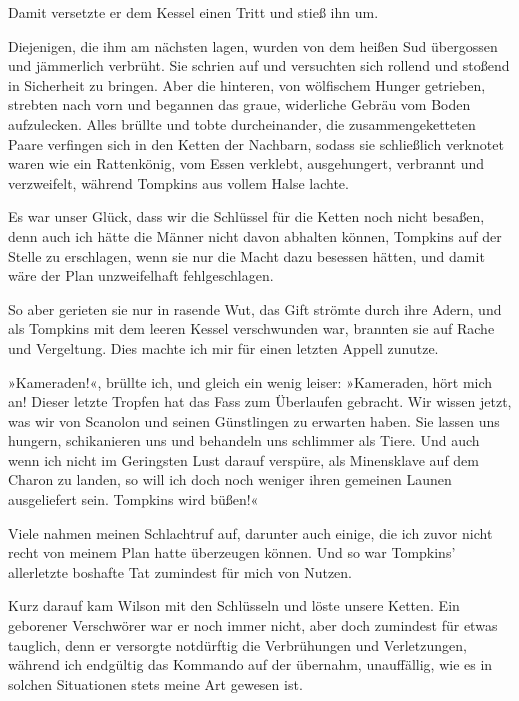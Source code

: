 Damit versetzte er dem Kessel einen Tritt und stieß ihn um.

Diejenigen, die ihm am nächsten lagen, wurden von dem heißen Sud
übergossen und jämmerlich verbrüht. Sie schrien auf und versuchten
sich rollend und stoßend in Sicherheit zu bringen. Aber die
hinteren, von wölfischem Hunger getrieben, strebten nach vorn und
begannen das graue, widerliche Gebräu vom Boden aufzulecken. Alles
brüllte und tobte durcheinander, die zusammengeketteten Paare
verfingen sich in den Ketten der Nachbarn, sodass sie schließlich
verknotet waren wie ein Rattenkönig, vom Essen verklebt,
ausgehungert, verbrannt und verzweifelt, während Tompkins aus
vollem Halse lachte.

Es war unser Glück, dass wir die Schlüssel für die Ketten noch
nicht besaßen, denn auch ich hätte die Männer nicht davon abhalten
können, Tompkins auf der Stelle zu erschlagen, wenn sie nur die
Macht dazu besessen hätten, und damit wäre der Plan unzweifelhaft
fehlgeschlagen.

\bigpar

So aber gerieten sie nur in rasende Wut, das Gift strömte durch
ihre Adern, und als Tompkins mit dem leeren Kessel verschwunden
war, brannten sie auf Rache und Vergeltung. Dies machte ich mir für
einen letzten Appell zunutze.

»Kameraden!«, brüllte ich, und gleich ein wenig leiser: »Kameraden,
hört mich an! Dieser letzte Tropfen hat das Fass zum Überlaufen
gebracht. Wir wissen jetzt, was wir von Scanolon und seinen
Günstlingen zu erwarten haben. Sie lassen uns hungern, schikanieren
uns und behandeln uns schlimmer als Tiere. Und auch wenn ich nicht
im Geringsten Lust darauf verspüre, als Minensklave auf dem Charon
zu landen, so will ich doch noch weniger ihren gemeinen Launen
ausgeliefert sein. Tompkins wird büßen!«

Viele nahmen meinen Schlachtruf auf, darunter auch einige, die ich
zuvor nicht recht von meinem Plan hatte überzeugen können. Und so
war Tompkins’ allerletzte boshafte Tat zumindest für mich von
Nutzen.

\bigpar

Kurz darauf kam Wilson mit den Schlüsseln und löste unsere Ketten.
Ein geborener Verschwörer war er noch immer nicht, aber doch
zumindest für etwas tauglich, denn er versorgte notdürftig die
Verbrühungen und Verletzungen, während ich endgültig das Kommando
auf der  übernahm, unauffällig, wie es in solchen
Situationen stets meine Art gewesen ist.

